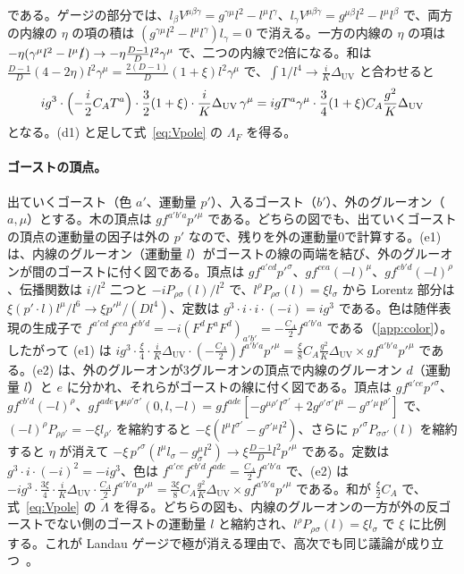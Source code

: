 \documentclass[a4paper,10pt]{ltjsarticle}
\newcommand{\DUV}{\Delta_{\mathrm{UV}}}
\begin{document}
である。ゲージの部分では、$l_\beta V^{\mu\beta\gamma}=g^{\gamma\mu}l^2-l^\mu l^\gamma$、$l_\gamma V^{\mu\beta\gamma}=g^{\mu\beta}l^2-l^\mu l^\beta$ で、両方の内線の $\eta$ の項の積は $(g^{\gamma\mu}l^2-l^\mu l^\gamma)l_\gamma=0$ で消える。一方の内線の $\eta$ の項は $-\eta(\gamma^\mu l^2-l^\mu\slashed l)\to-\eta\frac{D-1}Dl^2\gamma^\mu$ で、二つの内線で2倍になる。和は $\frac{D-1}D(4-2\eta)l^2\gamma^\mu=\frac{2(D-1)}D(1+\xi)l^2\gamma^\mu$ で、$\int1/l^4\to\frac iK\DUV$ と合わせると
\begin{equation*}
ig^3\cdot\Bigl(-\frac i2C_AT^a\Bigr)\cdot\frac32(1+\xi)\cdot\frac iK\DUV\,\gamma^\mu=igT^a\gamma^\mu\cdot\frac34(1+\xi)C_A\frac{g^2}K\DUV
\end{equation*}
となる。(d1) と足して式~\eqref{eq:Vpole} の $\Lambda_F$ を得る。

\paragraph{ゴーストの頂点。}出ていくゴースト（色 $a'$、運動量 $p'$）、入るゴースト（$b'$）、外のグルーオン（$a,\mu$）とする。木の頂点は $gf^{a'b'a}p'^\mu$ である。どちらの図でも、出ていくゴーストの頂点の運動量の因子は外の $p'$ なので、残りを外の運動量0で計算する。(e1) は、内線のグルーオン（運動量 $l$）がゴーストの線の両端を結び、外のグルーオンが間のゴーストに付く図である。頂点は $gf^{a'cd}p'^\sigma$、$gf^{cea}(-l)^\mu$、$gf^{eb'd}(-l)^\rho$、伝播関数は $i/l^2$ 二つと $-iP_{\rho\sigma}(l)/l^2$ で、$l^\rho P_{\rho\sigma}(l)=\xi l_\sigma$ から Lorentz 部分は $\xi(p'\cdot l)l^\mu/l^6\to\xi p'^\mu/(Dl^4)$、定数は $g^3\cdot i\cdot i\cdot(-i)=ig^3$ である。色は随伴表現の生成子で $f^{a'cd}f^{cea}f^{eb'd}=-i(F^dF^aF^d)_{a'b'}=-\frac{C_A}2f^{a'b'a}$ である（\ref{app:color}）。したがって (e1) は $ig^3\cdot\frac\xi4\cdot\frac iK\DUV\cdot(-\frac{C_A}2)f^{a'b'a}p'^\mu=\frac\xi8C_A\frac{g^2}K\DUV\times gf^{a'b'a}p'^\mu$ である。(e2) は、外のグルーオンが3グルーオンの頂点で内線のグルーオン $d$（運動量 $l$）と $e$ に分かれ、それらがゴーストの線に付く図である。頂点は $gf^{a'ce}p'^\sigma$、$gf^{cb'd}(-l)^\rho$、$gf^{ade}V^{\mu\rho'\sigma'}(0,l,-l)=gf^{ade}[-g^{\mu\rho'}l^{\sigma'}+2g^{\rho'\sigma'}l^\mu-g^{\sigma'\mu}l^{\rho'}]$ で、$(-l)^\rho P_{\rho\rho'}=-\xi l_{\rho'}$ を縮約すると $-\xi(l^\mu l^{\sigma'}-g^{\sigma'\mu}l^2)$、さらに $p'^\sigma P_{\sigma\sigma'}(l)$ を縮約すると $\eta$ が消えて $-\xi\,p'^\sigma(l^\mu l_\sigma-g^\mu_\sigma l^2)\to\xi\frac{D-1}Dl^2p'^\mu$ である。定数は $g^3\cdot i\cdot(-i)^2=-ig^3$、色は $f^{a'ce}f^{cb'd}f^{ade}=\frac{C_A}2f^{a'b'a}$ で、(e2) は $-ig^3\cdot\frac{3\xi}{4}\cdot\frac iK\DUV\cdot\frac{C_A}2f^{a'b'a}p'^\mu=\frac{3\xi}8C_A\frac{g^2}K\DUV\times gf^{a'b'a}p'^\mu$ である。和が $\frac\xi2C_A$ で、式~\eqref{eq:Vpole} の $\tilde\Lambda$ を得る。どちらの図も、内線のグルーオンの一方が外の反ゴーストでない側のゴーストの運動量 $l$ と縮約され、$l^\rho P_{\rho\sigma}(l)=\xi l_\sigma$ で $\xi$ に比例する。これが Landau ゲージで極が消える理由で、高次でも同じ議論が成り立つ~\cite{taylor}。
\end{document}
